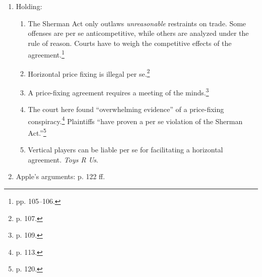 \begin{enumerate}
\begin{enumerate}
        began at once.''\footnote{p. 83.}
        \item Jobs acknowledged to a reporter that the goal was to eliminate 
        competition from Amazon and raise ebook prices.\footnote{p. 86.}
        \item Soon, the ebooks saw ``sudden and uniform price increases'' across 
        the market.\footnote{p. 94.} ``The publisher defendants used the change 
        to an agency method for distributing their e-books as an opportunity to 
        raise the prices for their e-books across the board.''\footnote{p. 96.}
        \item The publishers lost sales as a result of the price increases, and 
        consumers suffered because they had to pay more for ebooks, buy cheaper 
        ebooks, or defer purchases entirely.\footnote{p. 98.}
    \end{enumerate}
    \item Holding:
    \begin{enumerate}
        \item The Sherman Act only outlaws \emph{unreasonable} restraints on 
        trade. Some offenses are per se anticompetitive, while others are 
        analyzed under the rule of reason. Courts have to weigh the competitive 
        effects of the agreement.\footnote{pp. 105--106.}
        \item Horizontal price fixing is illegal per se.\footnote{p. 107.}
        \item A price-fixing agreement requires a meeting of the 
        minds.\footnote{p. 109.}
        \item The court here found ``overwhelming evidence'' of a price-fixing 
        conspiracy.\footnote{p. 113.} Plaintiffs ``have proven a per se 
        violation of the Sherman Act.''\footnote{p. 120.}
        \item Vertical players can be liable per se for facilitating a 
        horizontal agreement. \emph{Toys R Us}.
    \end{enumerate}
    \item Apple's arguments: p. 122 ff.
\end{enumerate}
